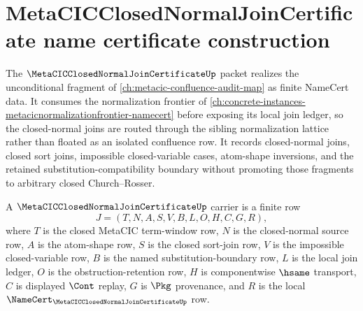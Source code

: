 \chapter{MetaCICClosedNormalJoinCertificate name certificate construction}
\label{ch:concrete-instances-metacic-closed-normal-join-certificate-namecert}

The $\MetaCICClosedNormalJoinCertificateUp$ packet realizes the unconditional fragment of \autoref{ch:metacic-confluence-audit-map} as finite NameCert data. It consumes the normalization frontier of \autoref{ch:concrete-instances-metacicnormalizationfrontier-namecert} before exposing its local join ledger, so the closed-normal joins are routed through the sibling normalization lattice rather than floated as an isolated confluence row. It records closed-normal joins, closed sort joins, impossible closed-variable cases, atom-shape inversions, and the retained substitution-compatibility boundary without promoting those fragments to arbitrary closed Church--Rosser.

\begin{definition}
\label{def:metacic-closed-normal-join-certificate-carrier}
A $\MetaCICClosedNormalJoinCertificateUp$ carrier is a finite row
$$
J=(T,N,A,S,V,B,L,O,H,C,G,R),
$$
where $T$ is the closed MetaCIC term-window row, $N$ is the closed-normal source row, $A$ is the atom-shape row, $S$ is the closed sort-join row, $V$ is the impossible closed-variable row, $B$ is the named substitution-boundary row, $L$ is the local join ledger, $O$ is the obstruction-retention row, $H$ is componentwise $\hsame$ transport, $C$ is displayed $\Cont$ replay, $G$ is $\Pkg$ provenance, and $R$ is the local $\NameCert_{\MetaCICClosedNormalJoinCertificateUp}$ row.
\end{definition}

